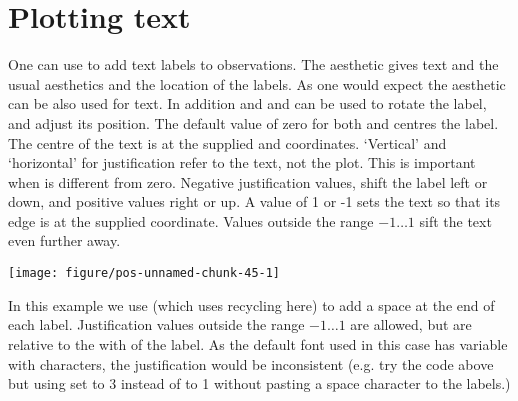\documentclass[paper=a4,10pt,div=17,headsepline,BCOR=12mm,twoside,open=right]{scrbook}\usepackage{knitr}
\begin{document}
\section{Plotting text}

One can use  to add text labels to observations. The aesthetic  gives text and the usual aesthetics  and  the location of the labels. As one would expect the  aesthetic can be also used for text. In addition  and  and  can be used to rotate the label, and adjust its position. The default value of zero for both  and  centres the label. The centre of the text is at the supplied  and  coordinates. `Vertical' and `horizontal' for justification refer to the text, not the plot. This is important when  is different from zero. Negative justification values, shift the label left or down, and positive values right or up. A value of 1 or -1 sets the text so that its edge is at the supplied coordinate. Values outside the range $-1\ldots 1$ sift the text even further away.

\begin{knitrout}\footnotesize
{}\color{fgcolor}\begin{kframe}
\begin{alltt}
 \hlkwb{<-}
  \hlstd{(}\hlstd{=}\hlopt{:}\hlstd{,} \hlstd{=}\hlstd{(}\hlstd{,} \hlstd{),} \hlstd{=}\hlstd{(letters[}\hlopt{:}\hlstd{],} \hlstd{))}
  \hlopt{+}
  \hlstd{(}\hlstd{=}\hlstd{,} \hlstd{=}\hlstd{)} \hlopt{+} \hlstd{()}
\end{alltt}
\end{kframe}

{\centering \texttt{[image: figure/pos-unnamed-chunk-45-1]} 

}



\end{knitrout}

In this example we use  (which uses recycling here) to add a space at the end of each label. Justification values outside the range $-1\ldots 1$ are allowed, but are relative to the with of the label. As the default font used in this case has variable with characters, the justification would be inconsistent (e.g. try the code above but using  set to 3 instead of to 1 without pasting a space character to the labels.)
\end{document}
